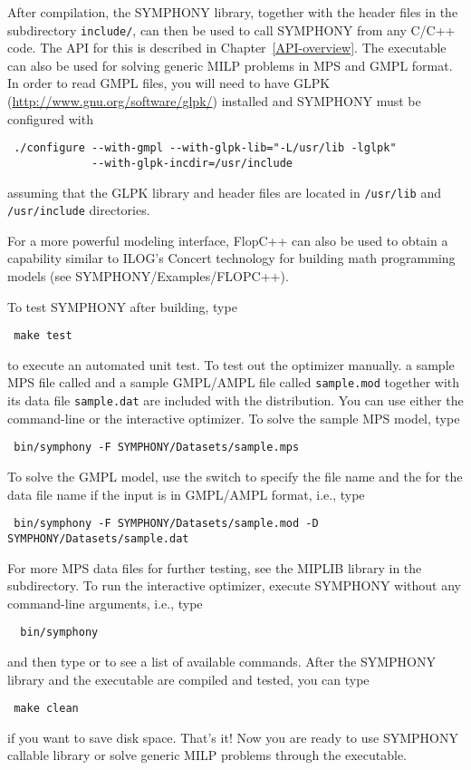 After compilation, the SYMPHONY library, together with the header files in the
subdirectory {\color{Brown}\texttt{include/}}, can then be used to call
SYMPHONY from any C/C++ code. The API for this is described in
Chapter~\ref{API-overview}. The executable can also be used for solving
generic MILP problems in MPS and GMPL format. In order to read GMPL files, you
will need to have GLPK (\url{http://www.gnu.org/software/glpk/}) installed and
SYMPHONY must be configured with {\color{Brown}
\begin{verbatim}
 ./configure --with-gmpl --with-glpk-lib="-L/usr/lib -lglpk"
             --with-glpk-incdir=/usr/include
\end{verbatim}
}
assuming that the GLPK library and header files are located in 
{\color{Brown}\texttt{/usr/lib}} and {\color{Brown}\texttt{/usr/include}}
directories. 

For a more powerful modeling interface, FlopC++ can also be used to obtain a
capability similar to ILOG's Concert technology for building math programming
models (see SYMPHONY/Examples/FLOPC++). 

To test SYMPHONY after building, type
{\color{Brown}
\begin{verbatim}
 make test
\end{verbatim}
} to execute an automated unit test. To test out the optimizer manually. a
sample MPS file called  and a sample GMPL/AMPL file called
{\color{Brown}\texttt{sample.mod}} together with its data file
{\color{Brown}\texttt{sample.dat}} are included with the distribution. You can
use either the command-line or the interactive optimizer. To solve the sample
MPS model, type {\color{Brown}
\begin{verbatim}
 bin/symphony -F SYMPHONY/Datasets/sample.mps
\end{verbatim}
} To solve the GMPL model, use the  switch to specify the file name
and the  for the data file name if the input is in GMPL/AMPL format,
i.e., type 
{\color{Brown}
\begin{verbatim}
 bin/symphony -F SYMPHONY/Datasets/sample.mod -D SYMPHONY/Datasets/sample.dat
\end{verbatim}}
For more MPS data files for further testing, see the MIPLIB library in the
 subdirectory. To run the interactive optimizer, execute SYMPHONY
without any command-line arguments, i.e., type
{\color{Brown}
\begin{verbatim}
  bin/symphony 
\end{verbatim}}
and then type  or  to see a list of available commands.
After the SYMPHONY library and the executable are compiled and tested, you
can type
{\color{Brown}
\begin{verbatim}
 make clean 
\end{verbatim}}
if you want to save disk space. That's it! Now you are ready to use SYMPHONY
callable library or solve generic MILP problems through the executable.

